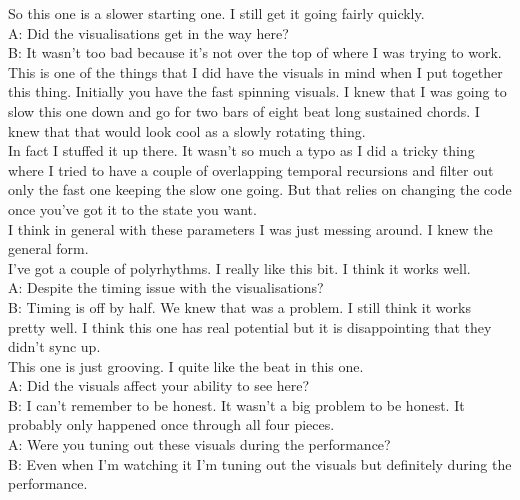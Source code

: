 So this one is a slower starting one. I still get it going fairly quickly.\\

A: Did the visualisations get in the way here?\\

B: It wasn't too bad because it's not over the top of where I was trying to work.\\

This is one of the things that I did have the visuals in mind when I put together this thing. Initially you have the fast spinning visuals. I knew that I was going to slow this one down and go for two bars of eight beat long sustained chords. I knew that that would look cool as a slowly rotating thing.\\

In fact I stuffed it up there. It wasn't so much a typo as I did a tricky thing where I tried to have a couple of overlapping temporal recursions and filter out only the fast one keeping the slow one going. But that relies on changing the code once you've got it to the state you want.\\

I think in general with these parameters I was just messing around. I knew the general form.\\

I've got a couple of polyrhythms. I really like this bit. I think it works well.\\

A: Despite the timing issue with the visualisations?\\

B: Timing is off by half. We knew that was a problem. I still think it works pretty well. I think this one has real potential but it is disappointing that they didn't sync up.\\

This one is just grooving. I quite like the beat in this one.\\

A: Did the visuals affect your ability to see here?\\

B: I can't remember to be honest. It wasn't a big problem to be honest. It probably only happened once through all four pieces.\\

A: Were you tuning out these visuals during the performance?\\

B: Even when I'm watching it I'm tuning out the visuals but definitely during the performance.\\

